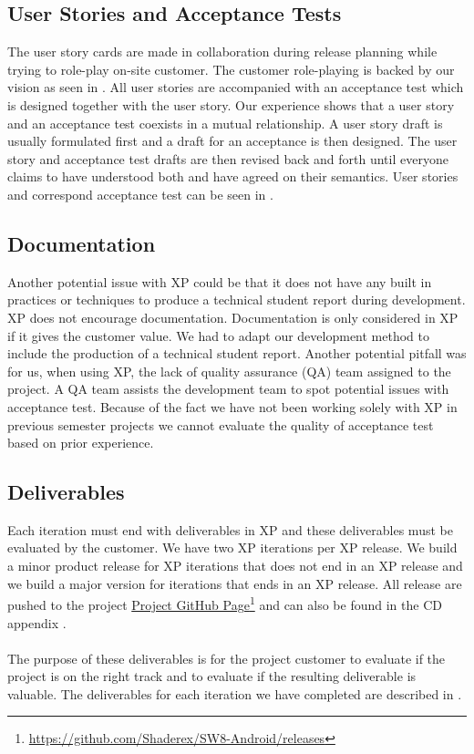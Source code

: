 \subsection{User Stories and Acceptance Tests}
The user story cards are made in collaboration during release planning while trying to role-play on-site customer. The customer role-playing is backed by our vision as seen in . All user stories are accompanied with an acceptance test which is designed together with the user story. Our experience shows that a user story and an acceptance test coexists in a mutual relationship. A user story draft is usually formulated first and a draft for an acceptance is then designed. The user story and acceptance test drafts are then revised back and forth until everyone claims to have understood both and have agreed on their semantics. User stories and correspond acceptance test can be seen in . 


\subsection{Documentation}
Another potential issue with XP could be that it does not have any built in practices or techniques to produce a technical student report during development. XP does not encourage documentation. Documentation is only considered in XP if it gives the customer value. We had to 
adapt our development method to include the production of a technical student report. Another potential pitfall was for us, when using XP, the lack of quality assurance (QA) team assigned to the project. A QA team assists the development team to spot potential issues with acceptance test. Because of the fact we have not been working solely with XP in previous semester projects we cannot evaluate the quality of acceptance test based on prior experience.

\subsection{Deliverables}
Each iteration must end with deliverables in XP and these deliverables must be evaluated by the customer. We have two XP iterations per XP release. We build a minor product release for XP iterations that does not end in an XP release and we build a major version for iterations that ends in an XP release. All release are pushed to the project \href{https://github.com/Shaderex/SW8-Android/releases}{Project GitHub Page}\footnote{\url{https://github.com/Shaderex/SW8-Android/releases}} and can also be found in the CD appendix . 
\\\\
The purpose of these deliverables is for the project customer to evaluate if the project is on the right track and to evaluate if the resulting deliverable is valuable. The deliverables for each iteration we have completed are described in . 


